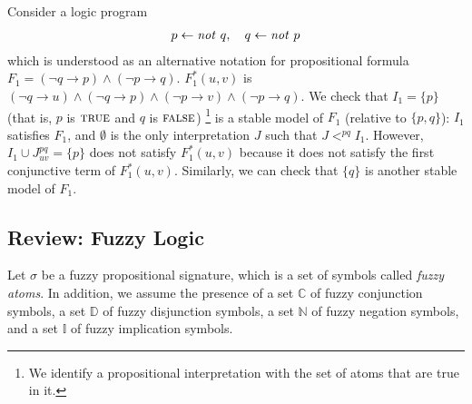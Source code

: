 \documentclass[runningheads]{llncs}
\def\ar{\leftarrow}
\def\ba{\begin{array}}
\def\ea{\end{array}}
\def\i#1{\hbox{\it #1\/}}
\def\no{\i{not}}
\def\ar{\leftarrow}
\def\rar{\rightarrow}
\def\no{\i{not}}
\def\false{\hbox{\sc false}}
\def\true{\hbox{\sc true}}
\def\i#1{\hbox{\itshape #1\/}}
\begin{document}
\begin{example}
Consider a logic program 
\[
\ba l
  p \ar \no\ q, \ \ \ 
  q \ar \no\ p 
\ea 
\]
which is understood as an alternative notation for propositional
formula $F_1 = (\neg q\rar p)\land (\neg p\rar q)$.
$F_1^*(u,v)$ is 
\hbox{$(\neg q\rar u)\land (\neg q\rar p)\land (\neg p\rar
   v)\land (\neg p\rar q)$}.
%
We check that $I_1 = \{p\}$ (that is, $p$ is $\true$ and $q$ is
$\false$) \footnote{%
We identify a propositional interpretation with the set of atoms that
are true in it. }
is a stable model of $F_1$ (relative to
$\{p,q\}$):  $I_1$ satisfies $F_1$, and $\emptyset$ is the
only interpretation $J$ such that $J<^{pq} I_1$. However, 
$I_1\cup J^{pq}_{uv} = \{p\}$ does not satisfy $F_1^*(u,v)$
because it does not satisfy the first conjunctive term of $F_1^*(u,v)$.
%
Similarly, we can check that $\{q\}$ is another stable model of $F_1$.
\end{example} 

\subsection{Review: Fuzzy Logic}  \label{ssec:review-fuzzy}


Let $\sigma$ be a fuzzy propositional signature, which is a set of
symbols called {\em fuzzy atoms}. In addition, we assume the presence of a
set $\mathbb{C}$ of fuzzy conjunction symbols, a set $\mathbb{D}$ of
fuzzy disjunction symbols, a set $\mathbb{N}$ of fuzzy negation
symbols, and a set $\mathbb{I}$ of fuzzy implication symbols. 
\end{document}
